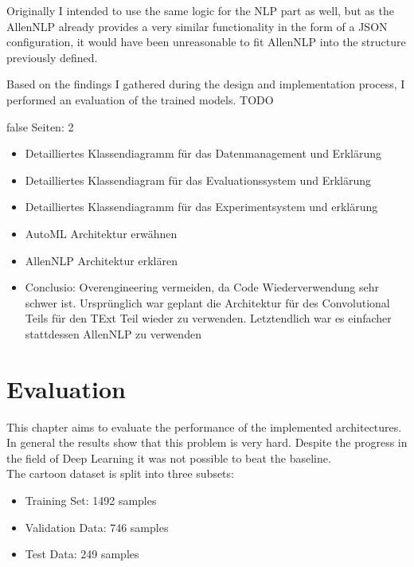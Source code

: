 \documentclass[draft,final,oneside]{vutinfth} %
\begin{document}
Originally I intended to use the same logic for the NLP part as well, but as the AllenNLP already provides a very similar functionality in the form of a JSON configuration, it would have been unreasonable to fit AllenNLP into the structure previously defined.

Based on the findings I gathered during the design and implementation process, I performed an evaluation of the trained models. TODO


\if false
Seiten: 2

\begin{itemize}

\item Detailliertes Klassendiagramm für das Datenmanagement und Erklärung
\item Detailliertes Klassendiagram für das Evaluationssystem und Erklärung
\item Detailliertes Klassendiagramm für das Experimentsystem und erklärung 
\item AutoML Architektur erwähnen
\item AllenNLP Architektur erklären
\item Conclusio: Overengineering vermeiden, da Code Wiederverwendung sehr schwer ist. Ursprünglich war geplant die Architektur für des Convolutional Teils für den TExt Teil wieder zu verwenden. Letztendlich war es einfacher stattdessen AllenNLP zu verwenden

\end{itemize}

\fi


\chapter{Evaluation} \label{evaluationchapter}

This chapter aims to evaluate the performance of the implemented architectures. In
general the results show that this problem is very hard. Despite the progress in the field of Deep Learning it was not possible to beat the baseline. \\

The cartoon dataset is split into three subsets:

\begin{itemize}
\item Training Set: 1492 samples %
\item Validation Data: 746 samples %
\item Test Data: 249 samples %
\end{itemize}
\end{document}
